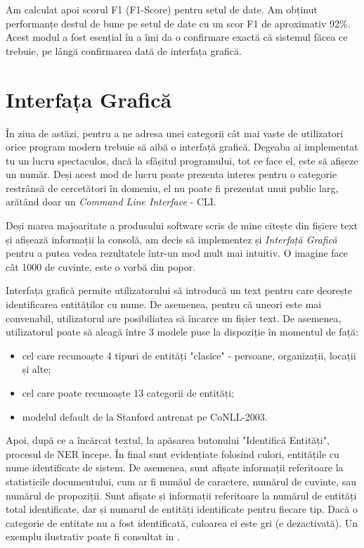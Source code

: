 Am calculat apoi scorul F1 (F1-Score) pentru setul de date. Am obținut performanțe destul de bune pe setul de date cu un scor F1 de aproximativ 92\%. Acest modul a fost esențial în a îmi da o confirmare exactă că sistemul făcea ce trebuie, pe lângă confirmarea dată de interfața grafică.

\section{Interfața Grafică}

În ziua de astăzi, pentru a ne adresa unei categorii cât mai vaste de utilizatori orice program modern trebuie să aibă o interfață grafică. Degeaba ai implementat tu un lucru spectaculos, dacă la sfâșitul programului, tot ce face el, este să afișeze un număr. Deși acest mod de lucru poate prezenta interes pentru o categorie restrânsă de cercetători în domeniu, el nu poate fi prezentat unui public larg, arătând doar un \textit{Command Line Interface} - CLI.

Deși marea majoaritate a produsului software scris de mine citește din fișiere text și afișează informații la consolă, am decis să implementez și \textit{Interfață Grafică} pentru a putea vedea rezultatele într-un mod mult mai intuitiv. O imagine face cât 1000 
de cuvinte, este o vorbă din popor.

Interfața grafică permite utilizatorului să introducă un text pentru care deorește identificarea entităților cu nume. De asemenea, pentru că uneori este mai convenabil, utilizatorul are posibiliatea să încarce un fișier text. De asemenea, utilizatorul poate să aleagă între 3 modele puse la dispoziție în momentul de față:
\begin{itemize}
\item  cel care recunoaște 4 tipuri de entități "clasice" - persoane, organizații, locații și alte;
\item cel care poate recunoaște 13 categorii de entități;
\item modelul default de la Stanford antrenat pe CoNLL-2003.
\end{itemize}

Apoi, după ce a încărcat textul, la apăsarea butonului "Identifică Entități", procesul de NER începe. În final sunt evidențiate folosind culori, entitățile cu nume identificate de sistem. De asemenea, sunt afișate informații referitoare la statisticile documentului, cum ar fi număul de caractere, numărul de cuvinte, sau numărul de propoziții. Sunt afișate și informații referitoare la numărul de entități total identificate, dar și numarul de entități identificate pentru fiecare tip. Dacă o categorie de entitate nu a fost identificată, culoarea ei este gri (e dezactivată). Un exemplu ilustrativ poate fi consultat in .

